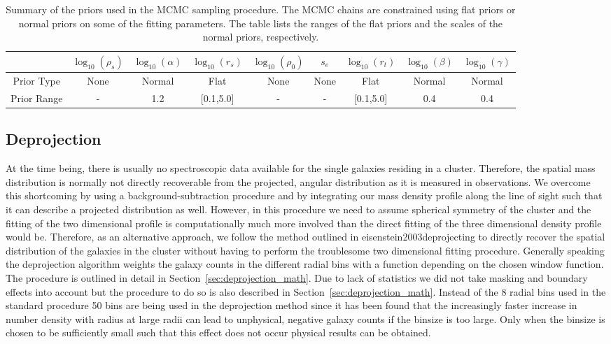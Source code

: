 \documentclass[a4paper,fleqn,usenatbib]{mnras}
\begin{document}
\begin{table}
    \centering
    \caption{Summary of the priors used in the MCMC sampling procedure. The MCMC chains are constrained using flat priors or normal priors on some of the fitting parameters. The table lists the ranges of the flat priors and the scales of the normal priors, respectively.}
    \label{tab:priors}
    \begin{tabular}{|c|c|c|c|c|c|c|c|c|}
    \hline 
    & $\log_{10}(\rho_s)$ & $\log_{10}(\alpha)$ & $\log_{10}(r_s)$ & $\log_{10}(\rho_0)$ & $s_e$ & $\log_{10}(r_t)$ & $\log_{10}(\beta)$ & $\log_{10}(\gamma)$ \\ 
    \hline 
    Prior Type & None & Normal & Flat & None & None & Flat & Normal & Normal\\ 
    \hline 
    Prior Range & - & 1.2 & [0.1,5.0] & - & - & [0.1,5.0] & 0.4 & 0.4\\
    \hline
    \end{tabular} 
\end{table}


\subsection{Deprojection}
\label{sec:Deprojection}
At the time being, there is usually no spectroscopic data available for the single galaxies residing in a cluster. Therefore, the spatial mass distribution is normally not directly recoverable from the projected, angular distribution as it is measured in observations. We overcome this shortcoming by using a background-subtraction procedure and by integrating our mass density profile along the line of sight such that it can describe a projected distribution as well. However, in this procedure we need to assume spherical symmetry of the cluster and the fitting of the two dimensional profile is computationally much more involved than the direct fitting of the three dimensional density profile would be. Therefore, as an alternative approach, we follow the method outlined in eisenstein2003deprojecting to directly recover the spatial distribution of the galaxies in the cluster without having to perform the troublesome two dimensional fitting procedure. Generally speaking the deprojection algorithm weights the galaxy counts in the different radial bins with a function depending on the chosen window function. The procedure is outlined in detail in Section~\ref{sec:deprojection_math}. Due to lack of statistics we did not take masking and boundary effects into account but the procedure to do so is also described in Section~\ref{sec:deprojection_math}. Instead of the 8 radial bins used in the standard procedure 50 bins are being used in the deprojection method since it has been found that the increasingly faster increase in number density with radius at large radii can lead to unphysical, negative galaxy counts if the binsize is too large. Only when the binsize is chosen to be sufficiently small such that this effect does not occur physical results can be obtained.
\end{document}

